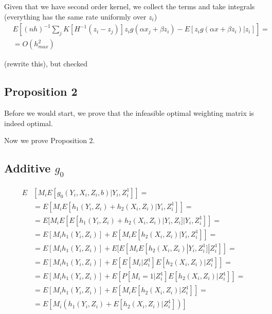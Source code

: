 \documentclass{article}
\theoremstyle{definition}
\theoremstyle{remark}
\begin{document}
Given that we have  second order kernel, we collect the terms and take integrals (everything has the same rate uniformly over $z_i$)
\begin{align}
&E[(nh)^{-1}\sum_j K[H^{-1}(z_i-z_j)] z_i g(\alpha x_j + \beta z_i)-E[z_i g(\alpha x + \beta z_i)|z_i]]= \\
&=O(h_{max}^2) \nonumber
\end{align}

{\color{red} (rewrite this), but checked}

\subsection{Proposition 2}
Before we would start, we prove that the infeasible optimal weighting matrix is indeed optimal.


Now we prove Proposition 2.

\subsection{Additive $g_0$}
\begin{align}
E&[M_i E[g_0(Y_i,X_i,Z_i,b)|Y_i,Z_i^1]]= \\
&= E[M_iE[h_1(Y_i,Z_i)+h_2(X_i,Z_i)|Y_i,Z_i^1]]= \nonumber \\
&= E[M_iE[E[h_1(Y_i,Z_i)+h_2(X_i,Z_i)|Y_i,Z_i]|Y_i,Z_i^1]]= \nonumber \\
&= E[M_i h_1(Y_i,Z_i)] +E[M_i E[h_2(X_i,Z_i)|Y_i, Z_i^1]]= \nonumber \\
&=E[M_i h_1(Y_i,Z_i)] +E[E[M_i E[h_2(X_i,Z_i)|Y_i, Z_i^1]|Z_i^1]]= \nonumber \\
&=E[M_i h_1(Y_i,Z_i)] +E[E[M_i|Z_i^1] E[h_2(X_i,Z_i)|Z_i^1]]= \nonumber \\
&=E[M_i h_1(Y_i,Z_i)] +E[P[M_i=1|Z_i^1]E[h_2(X_i,Z_i)|Z_i^1]]= \nonumber \\
&= E[M_i h_1(Y_i,Z_i)] +E[M_i E[h_2(X_i,Z_i)|Z^1_i]]= \nonumber \\
&= E\left[M_i (h_1(Y_i,Z_i) + E[h_2(X_i,Z_i)|Z^1_i])\right] \nonumber
\end{align}
\end{document}
